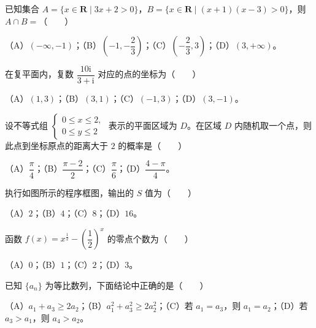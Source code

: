 

\begin{question}
已知集合 $A=\{x\in\mathbf R\mid3x+2>0\}$，$B=\{x\in\mathbf R\mid(x+1)(x-3)>0\}$，则 $A\cap B=$\mbox{（　　）}

（A）$(-\infty,-1)$；（B）$\left(-1,-\dfrac23\right)$；（C）$\left(-\dfrac23,3\right)$；（D）$(3,+\infty)$。

\end{question}
\begin{question}
在复平面内，复数 $\dfrac{10\mathrm i}{3+\mathrm i}$ 对应的点的坐标为\mbox{（　　）}

（A）$(1,3)$；（B）$(3,1)$；（C）$(-1,3)$；（D）$(3,-1)$。

\end{question}
\begin{question}
设不等式组 $\begin{cases}0\leqslant x\leqslant2,\\0\leqslant y\leqslant2\end{cases}$ 表示的平面区域为 $D$。在区域 $D$ 内随机取一个点，则此点到坐标原点的距离大于 $2$ 的概率是\mbox{（　　）}

（A）$\dfrac\pi4$；（B）$\dfrac{\pi-2}2$；（C）$\dfrac\pi6$；（D）$\dfrac{4-\pi}4$。

\Needspace{0.4\textheight}
\end{question}
\begin{question}
执行如图所示的程序框图，输出的 $S$ 值为\mbox{（　　）}
\nopagebreak[4]
\begin{center}\end{center}
\nopagebreak[4]
（A）$2$；（B）$4$；（C）$8$；（D）$16$。

\end{question}
\begin{question}
函数 $f(x)=x^{\frac12}-\left(\dfrac12\right)^x$ 的零点个数为\mbox{（　　）}

（A）$0$；（B）$1$；（C）$2$；（D）$3$。

\end{question}
\begin{question}
已知 $\{a_n\}$ 为等比数列，下面结论中正确的是\mbox{（　　）}

（A）$a_1+a_3\geqslant2a_2$；（B）$a_1^2+a_3^2\geqslant2a_2^2$；（C）若 $a_1=a_3$，则 $a_1=a_2$；（D）若 $a_3>a_1$，则 $a_4>a_2$。

\Needspace{0.4\textheight}
\end{question}
